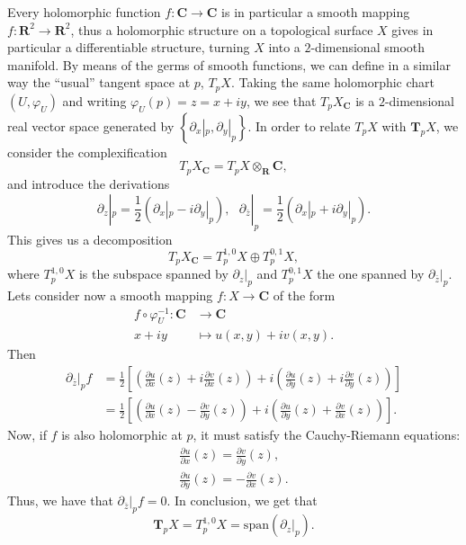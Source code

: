 \documentclass[12pt,a4paper]{book}
\theoremstyle{definition} \newtheorem{defn}[thm]{Definition}
\theoremstyle{definition} \newtheorem{ejemplo}[thm]{Example}
\theoremstyle{definition} \newtheorem{ejercicio}[thm]{Exercise}
\theoremstyle{remark} \newtheorem*{obs}{Remark}
\def\CC{\mathbf{C}}
\def\RR{\mathbf{R}}
\def\TT{\mathbf{T}}
\begin{document}
  Every holomorphic function $f:\CC \rightarrow \CC$ is in particular a smooth mapping $f:\RR^2 \rightarrow \RR^2$, thus a holomorphic structure on a topological surface $X$ gives in particular a differentiable structure, turning $X$ into a $2$-dimensional smooth manifold. By means of the germs of smooth functions, we can define in a similar way the ``usual'' tangent space at $p$, $T_pX$.
  Taking the same holomorphic chart $(U,\varphi_U)$ and writing $\varphi_U(p)=z=x+iy$, we see that $T_pX_{\CC}$ is a $2$-dimensional real vector space generated by $\left\{ \partial_x|_p, \partial_y|_p \right\}$.
  In order to relate $T_pX$ with $\TT_pX$, we consider the complexification
  \begin{equation*}
    T_pX_{\CC} = T_pX \otimes_\RR \CC,
  \end{equation*}
  and introduce the derivations
  \begin{equation*}
    \partial_z|_p = \frac{1}{2}(\partial_x|_p - i \partial_y|_p), \ \ \ \partial_{\bar{z}}|_p=\frac{1}{2}(\partial_x|_p + i \partial_y|_p).
  \end{equation*}
  This gives us a decomposition
  \begin{equation*}
    T_pX_{\CC} = T_p^{1,0}X \oplus T_p^{0,1}X,
  \end{equation*}
  where $T_p^{1,0}X$ is the subspace spanned by $\partial_z|_p$ and $T_p^{0,1}X$ the one spanned by $\partial_{\bar{z}}|_p$. Lets consider now a smooth mapping $f:X\rightarrow \CC$ of the form
  \begin{align*}
    f\circ \varphi^{-1}_U :\CC&\longrightarrow \CC\\ 
      x+iy &\longmapsto u(x,y)+iv(x,y). 
    \end{align*}
    Then 
    \begin{align*}
      \partial_{\bar{z}}|_p f &= \frac{1}{2}\left[ \left(\frac{\partial u}{\partial x}(z)+i\frac{\partial v}{\partial x}(z)\right)+i\left( \frac{\partial u}{\partial y}(z)+i\frac{\partial v}{\partial y}(z)  \right) \right] \\ 
      &=\frac{1}{2}\left[ \left(\frac{\partial u}{\partial x}(z)-\frac{\partial v}{\partial y}(z)\right)+i\left( \frac{\partial u}{\partial y}(z)+\frac{\partial v}{\partial x}(z)  \right) \right].
    \end{align*}
    Now, if $f$ is also holomorphic at $p$, it must satisfy the Cauchy-Riemann equations:
\begin{align*}
    \frac{\partial u}{\partial x}(z)=\frac{\partial v}{\partial y}(z), \\
    \frac{\partial u}{\partial y}(z)=-\frac{\partial v}{\partial x}(z).
\end{align*}
Thus, we have that $\partial_{\bar{z}}|_p f = 0$. In conclusion, we get that
\begin{equation*}
  \TT_p X= T^{1,0}_p X=\mathrm{span}(\partial_z|_p).
\end{equation*}
\end{document}
